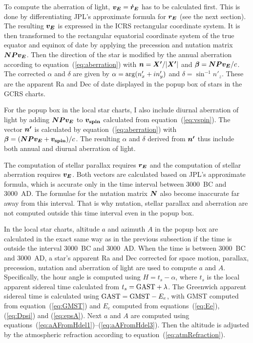 \documentclass[12pt]{article}
\newcommand{\ve}[1]{\mbox{\boldmath $#1$}}
\begin{document}
To compute the aberration of light, $\ve{v_E}=\ve{\dot{r}_E}$ has to be calculated 
first. This is done by differentiating JPL's approximate formula for $\ve{r_E}$ 
(see the next section). The resulting $\ve{v_E}$ is expressed in the ICRS rectangular 
coordinate system. It is then transformed to the rectangular equatorial coordinate system 
of the true equator and equinox of date by applying the precession and 
nutation matrix $\ve{NPv_E}$. Then the direction 
of the star is modified by the annual aberration according to equation~(\ref{eq:aberration}) 
with $\ve{n}=\ve{X'}/|\ve{X'}|$ and 
$\ve{\beta} = \ve{N P v_E}/c$. The corrected $\alpha$ and $\delta$ are given by 
$\alpha = {\rm arg}(n'_x + i n'_y)$ and $\delta = \sin^{-1} n'_z$. These are the 
apparent Ra and Dec of date displayed in the popup box of stars in the GCRS charts. 

For the popup box in the local star charts, I also include diurnal aberration of 
light by adding $\ve{NPv_E}$ to $\ve{v_{\rm spin}}$ calculated from 
equation~(\ref{eq:vspin}). The vector $\ve{n'}$ is calculated by 
equation~(\ref{eq:aberration}) with $\ve{\beta}=(\ve{NPv_E}+\ve{v_{\rm spin}})/c$. 
The resulting $\alpha$ and $\delta$ derived from $\ve{n'}$ thus include both 
annual and diurnal aberration of light. 

The computation of stellar parallax requires $\ve{r_E}$ and the computation 
of stellar aberration requires $\ve{v_E}$. Both vectors are calculated based on 
JPL's approximate formula, which is accurate only in the time interval between 
3000~BC and 3000~AD. The formulae for the nutation matrix $\ve{N}$ also 
become inaccurate far away from this interval. That is why nutation, stellar parallax 
and aberration are not computed outside this time interval even in the popup box.

In the local star charts, altitude $a$ and azimuth $A$ in the popup box are 
calculated in the exact same way as in the previous subsection if the time 
is outside the interval 3000~BC and 3000~AD. When the time is between 3000~BC 
and 3000~AD, a star's apparent Ra and Dec corrected for space motion, parallax, 
precession, nutation and aberration of light are used to compute $a$ and $A$. 
Specifically, the hour angle is computed using $H=t_s-\alpha$, where $t_s$ 
is the local apparent sidereal time calculated from 
$t_s={\rm GAST}+\lambda$. The Greenwich apparent sidereal time is calculated 
using ${\rm GAST = GMST} - E_e$, with GMST computed from equation~(\ref{eq:GMST}) 
and $E_e$ computed from equations~(\ref{eq:Ee}), (\ref{eq:Dpsi}) and (\ref{eq:epsA}). 
Next $a$ and $A$ are computed using
equations~(\ref{eq:aAFromHdel1})--(\ref{eq:aAFromHdel3}). Then the altitude
is adjusted by the atmospheric refraction according to equation~(\ref{eq:atmRefraction}).
\end{document}
